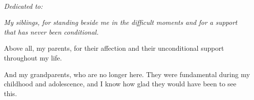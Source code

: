 ~\vfill
\begin{doublespace}
\noindent\fontsize{18}{22}\selectfont\itshape
\nohyphenation
\textcolor{itesomblue}{
Dedicated to:
}
\end{doublespace}

{\itshape
\noindent
My siblings, for standing beside me in the difficult moments and for a support
that has never been conditional.

\medskip
\noindent
Above all, my parents, for their affection and their unconditional support
throughout my life.

\medskip
\noindent
And my grandparents, who are no longer here. They were fundamental during my
childhood and adolescence, and I know how glad they would have been to see this.
\par}
\vfill
\vfill